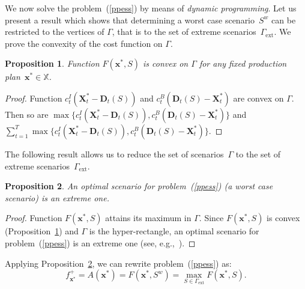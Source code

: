 \documentclass[11pt]{article}
\newtheorem{prop}{Proposition}
\newcommand{\Xset}{\mathbb{X}}
\begin{document}
We now solve the problem~(\ref{ppess})  by means of \emph{dynamic programming}.
Let us present a
result which shows that
determining a worst case scenario~$S^{w}$ 
can be restricted to the vertices of $\Gamma$, that is to the set
of  extreme scenarios~$\Gamma_{\text{ext}}$.
We prove the convexity of the cost function on $\Gamma$.
\begin{prop}
Function $F(\pmb{x}^{*},S)$ is convex on $\Gamma$ for any fixed production 
plan~$\pmb{x}^{*}\in \Xset$.
\label{ofcon}
\end{prop}
\begin{proof}
Function $c^I_t(\mathbf{X}^{*}_t-\mathbf{D}_t(S))$ and $c^{B}_t(\mathbf{D}_t(S)-\mathbf{X}^{*}_t)$
are convex on $\Gamma$. Then so are $\max\{c^{I}_t(\mathbf{X}^{*}_t-\mathbf{D}_t(S)),
c^{B}_t(\mathbf{D}_t(S)-\mathbf{X}^{*}_t)\}$
and $\sum_{t=1}^{T}\max\{c^{I}_t(\mathbf{X}^{*}_t-\mathbf{D}_t(S)),
c^{B}_t(\mathbf{D}_t(S)-\mathbf{X}^{*}_t)\}$.
\end{proof}
The following result allows us to 
reduce the set of scenarios~$\Gamma$  to the set
of  extreme scenarios~$\Gamma_{\text{ext}}$.
\begin{prop}
An optimal scenario for problem~(\ref{ppess}) (a worst case scenario) is an extreme one.
\label{pext}
\end{prop}
\begin{proof}
	Function $F(\pmb{x}^{*},S)$ attains its maximum in $\Gamma$.
	Since $F(\pmb{x}^{*},S)$ is convex (Proposition~\ref{ofcon}) 
	and $\Gamma$ is the hyper-rectangle,
	an optimal scenario 
	for problem~(\ref{ppess}) is an extreme one
	(see, e.g.,~\cite{M75}).
\end{proof}
Applying Proposition~\ref{pext}, we can rewrite problem~(\ref{ppess}) as:
\begin{equation}
f_{\pmb{x}^{*}}^{+}=
A(\pmb{x}^{*})=F(\pmb{x}^{*},S^{w})= \max_{S\in \Gamma_{\text{ext}}}F(\pmb{x}^{*},S).
\label{ppessex}
\end{equation}
\end{document}

